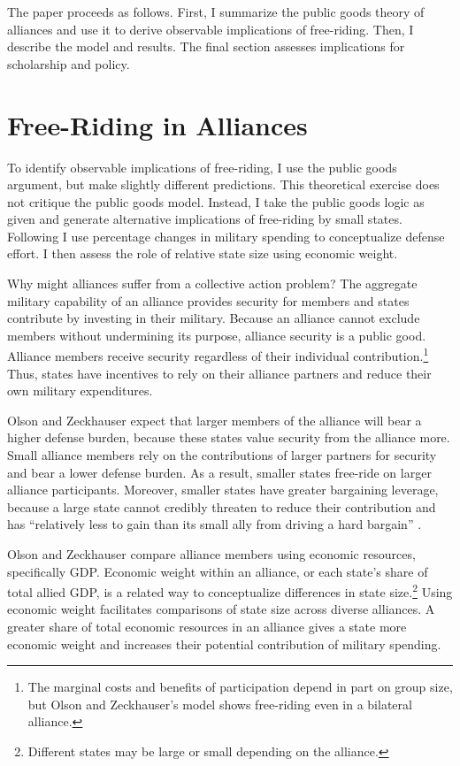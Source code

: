 \documentclass[12pt]{article}
\begin{document}
The paper proceeds as follows.
First, I summarize the public goods theory of alliances and use it to derive observable implications of free-riding.
Then, I describe the model and results. 
The final section assesses implications for scholarship and policy. 



\section{Free-Riding in Alliances}

To identify observable implications of free-riding, I use the public goods argument, but make slightly different predictions.
This theoretical exercise does not critique the public goods model.
Instead, I take the public goods logic as given and generate alternative implications of free-riding by small states. 
Following \citet{PluemperNeumayer2015} I use percentage changes in military spending to conceptualize defense effort.
I then assess the role of relative state size using economic weight. 


Why might alliances suffer from a collective action problem?
The aggregate military capability of an alliance provides security for members and states contribute by investing in their military.
Because an alliance cannot exclude members without undermining its purpose, alliance security is a public good. 
Alliance members receive security regardless of their individual contribution.\footnote{The marginal costs and benefits of participation depend in part on group size, but Olson and Zeckhauser's model shows free-riding even in a bilateral alliance.}
Thus, states have incentives to rely on their alliance partners and reduce their own military expenditures.  

 
Olson and Zeckhauser expect that larger members of the alliance will bear a higher defense burden, because these states value security from the alliance more.
Small alliance members rely on the contributions of larger partners for security and bear a lower defense burden.
As a result, smaller states free-ride on larger alliance participants. 
Moreover, smaller states have greater bargaining leverage, because a large state cannot credibly threaten to reduce their contribution and has ``relatively less to gain than its small ally from driving a hard bargain'' \citep[pg. 274]{OlsonZeckhauser1966}. 


Olson and Zeckhauser compare alliance members using economic resources, specifically GDP.
Economic weight within an alliance, or each state's share of total allied GDP, is a related way to conceptualize differences in state size.\footnote{Different states may be large or small depending on the alliance.} 
Using economic weight facilitates comparisons of state size across diverse alliances. 
A greater share of total economic resources in an alliance gives a state more economic weight and increases their potential contribution of military spending. 
\end{document}
